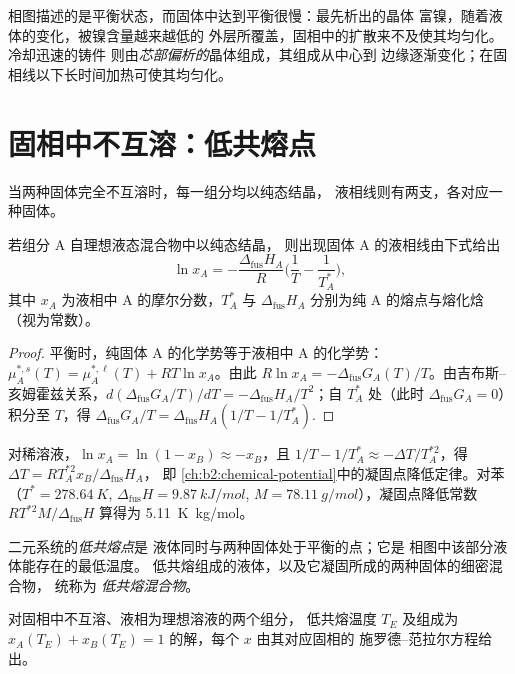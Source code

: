 相图描述的是平衡状态，而固体中达到平衡很慢：最先析出的晶体
富镍，随着液体的变化，被镍含量越来越低的
外层所覆盖，固相中的扩散来不及使其均匀化。冷却迅速的铸件
则由\textit{芯部偏析的}晶体组成，其组成从中心到
边缘逐渐变化；在固相线以下长时间加热可使其均匀化。

\section{固相中不互溶：低共熔点}

当两种固体完全不互溶时，每一组分均以纯态结晶，
液相线则有两支，各对应一种固体。

\begin{theorem}\label{thm:b2:solid-liquid-diagrams:schroder}
若组分 A 自理想液态混合物中以纯态结晶，
则出现固体 A 的液相线由下式给出
\[
  \ln x_A = -\frac{\Delta_{\text{fus}}H_A}{R}\Big(\frac1T - \frac1{T_A^*}\Big),
\]
其中 $x_A$ 为液相中 A 的摩尔分数，$T_A^*$ 与
$\Delta_{\text{fus}}H_A$ 分别为纯 A 的熔点与熔化焓
（视为常数）。
\end{theorem}

\begin{proof}
平衡时，纯固体 A 的化学势等于液相中 A 的化学势：
$\mu_A^{*,s}(T) = \mu_A^{*,\ell}(T) + RT\ln x_A$。由此 $R\ln x_A =
-\Delta_{\text{fus}}G_A(T)/T$。由吉布斯--亥姆霍兹关系，$d(\Delta_{\text{fus}}G_A/T)/
dT = -\Delta_{\text{fus}}H_A/T^2$；自 $T_A^*$
处（此时 $\Delta_{\text{fus}}G_A = 0$）积分至 $T$，得 $\Delta_{\text{fus}}G_A/T =
\Delta_{\text{fus}}H_A(1/T - 1/T_A^*)$.
\end{proof}

对稀溶液，$\ln x_A = \ln(1 - x_B) \approx -x_B$，且 $1/T -
1/T_A^* \approx -\Delta T/T_A^{*2}$，得 $\Delta T = RT_A^{*2}x_B/\Delta_{\text{fus}}H_A$，
即 \cref{ch:b2:chemical-potential}中的凝固点降低定律。对苯（$T^* =
\qty{278.64}{K}$, $\Delta_{\text{fus}}H = \qty{9.87}{kJ/mol}$, $M =
\qty{78.11}{g/mol}$），凝固点降低常数 $RT^{*2}M/\Delta_{\text{fus}}H$
算得为 \qty{5.11}{K.kg/mol}。

\begin{definition}[低共熔点]\label{def:b2:solid-liquid-diagrams:eutectic}
二元系统的\emph{低共熔点}是
液体同时与两种固体处于平衡的点；它是
相图中该部分液体能存在的最低温度。
低共熔组成的液体，以及它凝固所成的两种固体的细密混合物，
统称为
\emph{低共熔混合物}。
\end{definition}

\begin{corollary}[低共熔点即两支液相线的交点]\label{cor:b2:solid-liquid-diagrams:eutectic}
对固相中不互溶、液相为理想溶液的两个组分，
低共熔温度 $T_E$ 及组成为
$x_A(T_E) + x_B(T_E) = 1$ 的解，每个 $x$ 由其对应固相的
施罗德–范拉尔方程给出。
\end{corollary}

